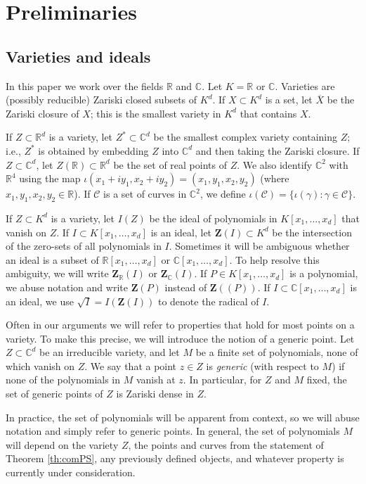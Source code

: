 \documentclass[letterpaper, reqno,11pt]{article}
\theoremstyle{remark}
\newcommand{\RR}{\mathbb{R}}
\newcommand{\CC}{\mathbb{C}}
\newcommand{\BZ}{\mathbf{Z}}
\begin{document}
%
%
\section{Preliminaries}\label{algGeoToolsSec}
\subsection{Varieties and ideals} \label{ssec:Quant}

In this paper we work over the fields $\RR$ and $\CC$.
Let $K=\RR$ or $\CC$.
Varieties are (possibly reducible) Zariski closed subsets of $K^d$.
If $X\subset K^d$ is a set, let $\overline{X}$
be the Zariski closure of $X$; this is the smallest variety in $K^d$
that contains $X$.

If $Z\subset\RR^d$ is a variety, let $Z^*\subset\CC^d$ be the smallest complex variety containing $Z$; i.e., $Z^*$ is obtained by embedding $Z$ into $\CC^d$ and then taking the Zariski closure.
If $Z\subset\CC^d$, let $Z(\RR)\subset\RR^d$ be the set of real points of $Z$.
We also identify $\CC^2$ with $\RR^4$ using the map $\iota(x_1+iy_1,x_2+iy_2)=(x_1,y_1,x_2,y_2)$ (where $x_1,y_1,x_2,y_2\in \RR$).
If $\mathcal{C}$ is a set of curves in $\CC^2$, we define $\iota(\mathcal{C})=\{\iota(\gamma)\colon\gamma\in\mathcal{C}\}$.

If $Z\subset K^d$ is a variety, let $I(Z)$ be the ideal of polynomials in $K[x_1,\ldots,x_d]$ that vanish on $Z$. If $I\subset K[x_1,\ldots,x_d]$ is an ideal, let $\BZ(I)\subset K^d$ be the intersection of the zero-sets of all polynomials in $I$. Sometimes it will be ambiguous whether an ideal is a subset of $\RR[x_1,\ldots,x_d]$ or $\CC[x_1,\ldots,x_d]$. To help resolve this ambiguity, we will write $\BZ_{\RR}(I)$ or $\BZ_{\CC}(I)$. If $P\in K[x_1,\ldots,x_d]$ is a polynomial, we abuse notation and write $\BZ(P)$ instead of $\BZ((P))$. If $I\subset\CC[x_1,\ldots,x_d]$ is an ideal, we use $\sqrt{I}=I(\BZ(I))$ to denote the radical of $I$.

Often in our arguments we will refer to properties that hold for most points on a variety. To make this precise, we will introduce the notion of a generic point.
Let $Z\subset\CC^d$ be an irreducible variety, and let $M$ be a finite set of polynomials, none of which vanish on $Z$. We say that a point $z\in Z$ is \emph{generic} (with respect to $M$) if none of the polynomials in $M$ vanish at $z$. In particular, for $Z$ and $M$ fixed, the set of generic points of $Z$ is Zariski dense in $Z$.

In practice, the set of polynomials will be apparent from context, so we will abuse notation and simply refer to generic points. In general, the set of polynomials $M$ will depend on the variety $Z$, the points and curves from the statement of Theorem \ref{th:comPS}, any previously defined objects, and whatever property is currently under consideration.
\end{document}

